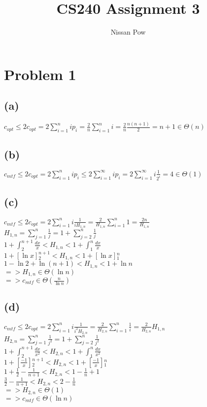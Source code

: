 \documentclass{article}[12pt]
\title{CS240 Assignment 3}
\author{Nissan Pow}
\begin{document}
\maketitle

\section*{Problem 1}
\subsection*{(a)}
$c_{opt} \le 2c_{opt} = 2\sum_{i=1}^{n} ip_{i} = \frac{2}{n} \sum_{i=1}^{n} i = \frac{2}{n} \frac{n(n+1)}{2} = n+1 \in \Theta(n)$ \\

\subsection*{(b)}
$c_{mtf} \le 2c_{opt} = 2\sum_{i=1}^{n} ip_{i} \le 2\sum_{i=1}^{\infty} ip_{i} = 2\sum_{i=1}^{\infty} i \frac{1}{2^{i}} = 4 \in \Theta(1)$

\subsection*{(c)}
$c_{mtf} \le 2c_{opt} = 2\sum_{i=1}^{n} i \frac{1}{iH_{1,n}} = \frac{2}{H_{1,n}} \sum_{i=1}^{n} 1 = \frac{2n}{H_{1,n}}$ \\
$H_{1,n} = \sum_{j=1}^{n} \frac{1}{j} = 1 + \sum_{j=2}^{n} \frac{1}{j}$ \\ 
$1 + \int_{2}^{n+1} \frac{dx}{x} < H_{1,n} < 1 + \int_{1}^{n} \frac{dx}{x}$ \\ 
$1 + [\ln x]{}_{2}^{n+1} < H_{1,n} < 1 + [\ln x]{}_{1}^{n}$ \\
$1 - \ln 2 + \ln (n+1) < H_{1,n} < 1 + \ln n$ \\
$=> H_{1,n} \in \Theta(\ln n)$ \\
$=> c_{mtf} \in \Theta(\frac{n}{\ln n})$ \\

\subsection*{(d)}
$c_{mtf} \le 2c_{opt} = 2\sum_{i=1}^{n} i \frac{1}{i^{2}H_{2,n}} = \frac{2}{H_{2,n}} \sum_{i=1}^{n} \frac{1}{i} = \frac{2}{H_{2,n}} H_{1,n}$ \\
$H_{2,n} = \sum_{j=1}^{n} \frac{1}{j^{2}} = 1 + \sum_{j=2}^{n} \frac{1}{j^{2}}$ \\ 
$1 + \int_{2}^{n+1} \frac{dx}{x^{2}} < H_{2,n} < 1 + \int_{1}^{n} \frac{dx}{x^{2}}$ \\ 
$1 + [\frac{-1}{x}]{}_{2}^{n+1} < H_{2,n} < 1 + [\frac{-1}{x}]{}_{1}^{n}$ \\
$1 + \frac{1}{2} - \frac{1}{n+1} < H_{2,n} < 1 - \frac{1}{n} + 1$ \\
$\frac{3}{2} - \frac{1}{n+1} < H_{2,n} < 2 - \frac{1}{n}$ \\
$=> H_{2,n} \in \Theta(1)$ \\
$=> c_{mtf} \in \Theta(\ln n)$ \\
\end{document}
